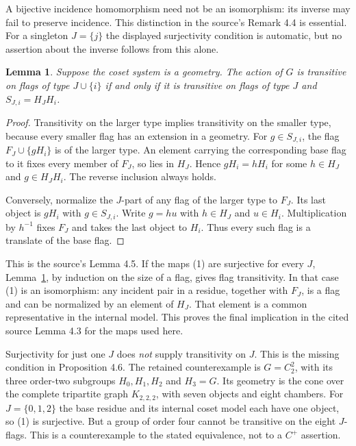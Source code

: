 \documentclass[11pt]{article}
\newtheorem{lemma}[theorem]{Lemma}
\begin{document}
A bijective incidence homomorphism need not be an isomorphism: its
inverse may fail to preserve incidence. This distinction in the source's
Remark 4.4 is essential. For a singleton $J=\{j\}$ the displayed
surjectivity condition is automatic, but no assertion about the inverse
follows from this alone.

\begin{lemma}\label{extension}
Suppose the coset system is a geometry. The action of $G$ is
transitive on flags of type $J\cup\{i\}$ if
and only if it is transitive on flags of type $J$ and
$S_{J,i}=H_JH_i$.
\end{lemma}
\begin{proof}
Transitivity on the larger type implies transitivity on the smaller
type, because every smaller flag has an extension in a geometry.
For $g\in S_{J,i}$, the flag $F_J\cup\{gH_i\}$ is of the larger
type. An element carrying the corresponding base flag to it fixes
every member of $F_J$, so lies in $H_J$. Hence $gH_i=hH_i$ for
some $h\in H_J$ and $g\in H_JH_i$. The reverse inclusion always
holds.

Conversely, normalize the $J$-part of any flag of the larger type
to $F_J$. Its last object is $gH_i$ with $g\in S_{J,i}$. Write
$g=hu$ with $h\in H_J$ and $u\in H_i$. Multiplication by $h^{-1}$
fixes $F_J$ and takes the last object to $H_i$. Thus every such flag
is a translate of the base flag.
\end{proof}

This is the source's Lemma 4.5. If the maps (1) are surjective for
every $J$, Lemma~\ref{extension}, by induction on the size of a flag,
gives flag transitivity. In that case (1) is an isomorphism: any
incident pair in a residue, together with $F_J$, is a flag and can
be normalized by an element of $H_J$. That element is a common
representative in the internal model. This proves the final implication
in the cited source Lemma 4.3 for the maps used here.

Surjectivity for just one $J$ does \emph{not} supply transitivity on
$J$. This is the missing condition in Proposition 4.6. The retained
counterexample is $G=C_2^2$, with its three order-two subgroups
$H_0,H_1,H_2$ and $H_3=G$. Its geometry is the cone over the complete
tripartite graph $K_{2,2,2}$, with seven objects and eight chambers.
For $J=\{0,1,2\}$ the base residue and its internal coset model each
have one object, so (1) is surjective. But a group of order four
cannot be transitive on the eight $J$-flags. This is a counterexample
to the stated equivalence, not to a $C^+$ assertion.
\end{document}
